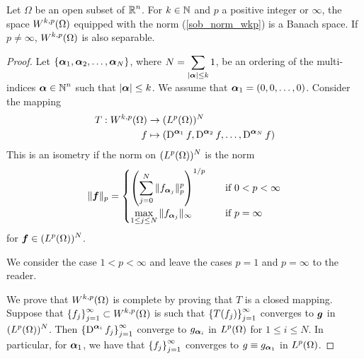 \begin{theorem}
Let $\Omega$ be an open subset of $\displaystyle \mathbb{R}^n$.  For $k\in \mathbb{N}$ and
$p$ a positive integer or $\infty$, the space
$\displaystyle W^{k,p}(\Omega)$ equipped with
the norm (\ref{sob_norm_wkp}) is a Banach space.  If $p \neq \infty$,
$\displaystyle W^{k,p}(\Omega)$ is also separable.
\end{theorem}

\begin{proof}
Let $\displaystyle \left\{ {\bm{\alpha}}_1, {\bm{\alpha}}_2, \ldots,
{\bm{\alpha}}_N \right\}$,
where $\displaystyle N = \sum_{|{\bm{\alpha}}|\leq k} 1$, be an ordering of
the multi-indices $\displaystyle {\bm{\alpha}} \in \mathbb{N}^n$ such that
$|{\bm{\alpha}}|\leq k$.  We assume that
${\bm{\alpha}}_1 = (0, 0, \ldots, 0)$.  Consider the mapping
\begin{align*}
T: W^{k,p}(\Omega) & \rightarrow (L^p(\Omega))^N \\
f &\mapsto \left( \operatorname{D}^{{\bm{\alpha}}_1} f , \operatorname{D}^{{\bm{\alpha}}_2} f, \ldots,
\operatorname{D}^{{\bm{\alpha}}_N} f \right)
\end{align*}
This is an isometry if the norm on $\displaystyle (L^p(\Omega))^N$ is
the norm
\[
\| {\bm{f}} \|_{p} =
\begin{cases}
\displaystyle \left( \sum_{j=0}^N \| f_{{\bm{\alpha}}_j} \|_p^p \right)^{1/p} &
\quad \text{if} \ 0 < p < \infty \\
\displaystyle \max_{1\leq j \leq N} \| f_{{\bm{\alpha}}_j} \|_\infty &
\quad \text{if} \ p = \infty
\end{cases}
\]
for $\displaystyle {\bm{f}} \in (L^p(\Omega))^N$.

  We consider the case $1<p<\infty$ and leave the cases $p =1$ and
$p=\infty$ to the reader.

We prove that $\displaystyle W^{k,p}(\Omega)$ is complete
by proving that $T$ is a closed mapping. Suppose that
$\displaystyle \left\{f_j \right\}_{j=1}^\infty \subset W^{k,p}(\Omega)$
is such that $\displaystyle \left\{T(f_j) \right\}_{j=1}^\infty$
converges to ${\bm{g}}$ in $\displaystyle (L^p(\Omega))^N$.  Then
$\displaystyle \left\{ \operatorname{D}^{{\bm{\alpha}}_i} f_j \right\}_{j=1}^\infty$
converge to $g_{{\bm{\alpha}}_i}$ in $\displaystyle L^p(\Omega)$ for
$1\leq i \leq N$.  In particular, for ${\bm{\alpha}}_1$, we have that
$\displaystyle \left\{ f_j \right\}_{j=1}^\infty$
converges to $g \equiv g_{{\bm{\alpha}}_1}$ in $\displaystyle L^p(\Omega)$.


\end{proof}
